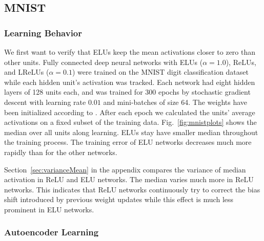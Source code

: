 \documentclass{article}
\begin{document}
\subsection{MNIST}

\subsubsection{Learning Behavior}
We first want to verify that ELUs keep the mean activations closer to
zero than other units. Fully connected deep neural networks
with ELUs ($\alpha=1.0$), ReLUs, and LReLUs ($\alpha=0.1$) were
trained on the MNIST digit classification
dataset while each hidden unit's activation was tracked.
Each network had eight hidden layers of 128 units each, and was trained
for 300 epochs by
stochastic gradient descent with
learning rate $0.01$ and mini-batches of size 64.
The weights have been initialized according to \citep{He:15}.
After each epoch we calculated the units' average activations on a fixed
subset of the training data.
Fig.~\ref{fig:mnistplots} shows the median over all units along learning.
ELUs stay have smaller median throughout the training process.
The training error of ELU networks decreases much more rapidly than for the other
networks.

Section~\ref{sec:varianceMean} in the appendix compares the variance
of median activation in ReLU and ELU networks.
The median varies much more in ReLU networks.
This indicates that ReLU networks continuously try to correct
the bias shift introduced by previous weight updates
while this effect is much less prominent in ELU networks.

\subsubsection{Autoencoder Learning}
\end{document}
